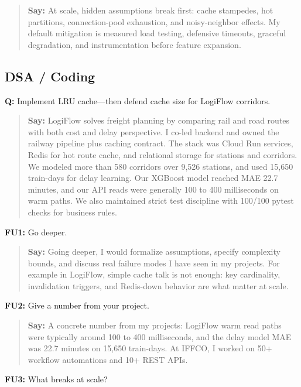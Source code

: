 \documentclass[9pt,a4paper]{article}
\begin{document}
\begin{quote}\small\textbf{Say:} At scale, hidden assumptions break first: cache stampedes, hot partitions, connection-pool exhaustion, and noisy-neighbor effects. My default mitigation is measured load testing, defensive timeouts, graceful degradation, and instrumentation before feature expansion.\end{quote}
\vspace{2mm}
\subsection{DSA / Coding}
\textbf{Q:} Implement LRU cache---then defend cache size for LogiFlow corridors.

\begin{quote}\small\textbf{Say:} LogiFlow solves freight planning by comparing rail and road routes with both cost and delay perspective. I co-led backend and owned the railway pipeline plus caching contract. The stack was Cloud Run services, Redis for hot route cache, and relational storage for stations and corridors. We modeled more than 580 corridors over 9,526 stations, and used 15,650 train-days for delay learning. Our XGBoost model reached MAE 22.7 minutes, and our API reads were generally 100 to 400 milliseconds on warm paths. We also maintained strict test discipline with 100/100 pytest checks for business rules.\end{quote}
\vspace{2mm}
\textbf{FU1:} Go deeper.

\begin{quote}\small\textbf{Say:} Going deeper, I would formalize assumptions, specify complexity bounds, and discuss real failure modes I have seen in my projects. For example in LogiFlow, simple cache talk is not enough: key cardinality, invalidation triggers, and Redis-down behavior are what matter at scale.\end{quote}
\vspace{2mm}
\textbf{FU2:} Give a number from your project.

\begin{quote}\small\textbf{Say:} A concrete number from my projects: LogiFlow warm read paths were typically around 100 to 400 milliseconds, and the delay model MAE was 22.7 minutes on 15,650 train-days. At IFFCO, I worked on 50+ workflow automations and 10+ REST APIs.\end{quote}
\vspace{2mm}
\textbf{FU3:} What breaks at scale?
\end{document}
